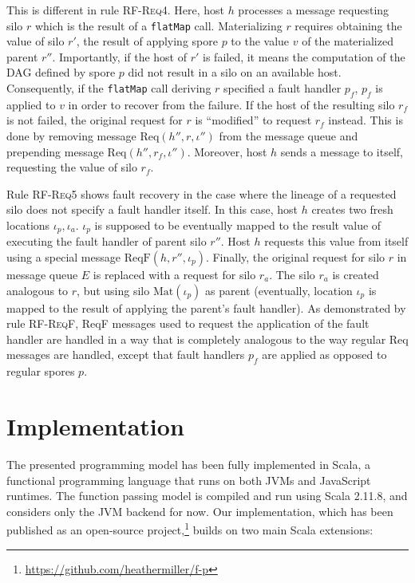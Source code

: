 \documentclass[10pt]{sigplanconf}
\theoremstyle{definition}
\theoremstyle{definition}
\begin{document}
This is different in rule \textsc{RF-Req4}. Here, host $h$ processes a message
requesting silo $r$ which is the result of a \texttt{flatMap} call.
Materializing $r$ requires obtaining the value of silo $r'$, the result of
applying spore $p$ to the value $v$ of the materialized parent $r''$.
Importantly, if the host of $r'$ is failed, it means the computation of the DAG
defined by spore $p$ did not result in a silo on an available host.
Consequently, if the \texttt{flatMap} call deriving $r$ specified a fault
handler $p_f$, $p_f$ is applied to $v$ in order to recover from the failure.
If the host of the resulting silo $r_f$ is not failed, the original request for
$r$ is ``modified'' to request $r_f$ instead. This is done by removing message
$\text{Req}(h'', r, \iota'')$ from the message queue and prepending message
$\text{Req}(h'', r_f, \iota'')$. Moreover, host $h$ sends a message to itself,
requesting the value of silo $r_f$.

Rule \textsc{RF-Req5} shows fault recovery in the case where the lineage of a
requested silo does not specify a fault handler itself. In this case, host $h$
creates two fresh locations $\iota_p, \iota_a$. $\iota_p$ is supposed to be
eventually mapped to the result value of executing the fault handler of parent
silo $r''$. Host $h$ requests this value from itself using a special message
$\text{ReqF}(h, r'', \iota_p)$. Finally, the original request for silo $r$ in
message queue $E$ is replaced with a request for silo $r_a$. The silo $r_a$ is
created analogous to $r$, but using silo $\text{Mat}(\iota_p)$ as parent
(eventually, location $\iota_p$ is mapped to the result of applying the
parent's fault handler). As demonstrated by rule \textsc{RF-ReqF}, ReqF
messages used to request the application of the fault handler are handled in a
way that is completely analogous to the way regular Req messages are handled,
except that fault handlers $p_f$ are applied as opposed to regular spores $p$.

\section{Implementation}
\label{sec:implementation}

The presented programming model has been fully implemented in Scala, a
functional programming language that runs on both JVMs and JavaScript runtimes.
The function passing model is compiled and run using Scala 2.11.8, and considers only the JVM backend
for now. Our implementation, which has been published as an open-source
project,\footnote{\url{https://github.com/heathermiller/f-p}} builds on two
main Scala extensions:
\end{document}
